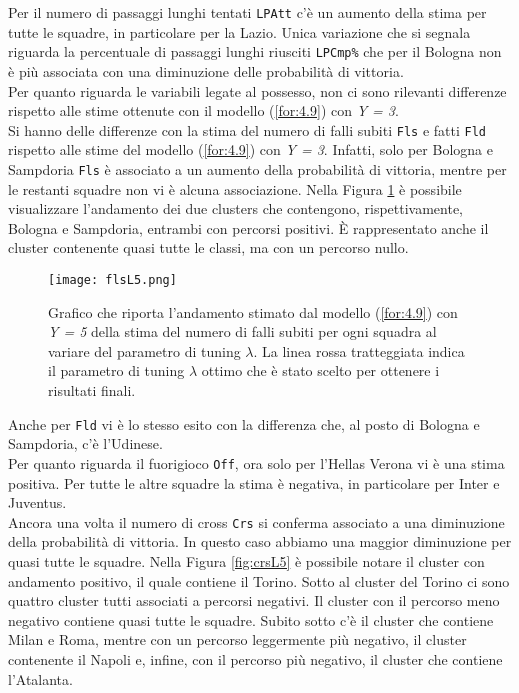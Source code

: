 Per il numero di passaggi lunghi tentati \texttt{LPAtt} c'è un aumento della stima per tutte le squadre, in particolare per la Lazio. Unica variazione che si segnala riguarda la percentuale di passaggi lunghi riusciti \texttt{LPCmp\%} che per il Bologna non è più associata con una diminuzione delle probabilità di vittoria.\\
Per quanto riguarda le variabili legate al possesso, non ci sono rilevanti differenze rispetto alle stime ottenute con il modello (\ref{for:4.9}) con \emph{Y = 3}.\\
Si hanno delle differenze con la stima del numero di falli subiti \texttt{Fls} e fatti \texttt{Fld} rispetto alle stime del modello (\ref{for:4.9}) con \emph{Y = 3}. Infatti, solo per Bologna e Sampdoria \texttt{Fls} è associato a un aumento della probabilità di vittoria, mentre per le restanti squadre non vi è alcuna associazione. Nella Figura \ref{fig:flsL5} è possibile visualizzare l'andamento dei due clusters che contengono, rispettivamente, Bologna e Sampdoria, entrambi con percorsi positivi. È rappresentato anche il cluster contenente quasi tutte le classi, ma con un percorso nullo.
\begin{figure}[htbp]
	\begin{center}
		\texttt{[image: flsL5.png]}
		\caption{Grafico che riporta l'andamento stimato dal modello (\ref{for:4.9}) con \emph{Y = 5} della stima del numero di falli subiti per ogni squadra al variare del parametro di tuning $\lambda$. La linea rossa tratteggiata indica il parametro di tuning $\lambda$ ottimo che è stato scelto per ottenere i risultati finali.} \label{fig:flsL5}
	\end{center}
\end{figure}
Anche per \texttt{Fld} vi è lo stesso esito con la differenza che, al posto di Bologna e Sampdoria, c'è l'Udinese.\\
Per quanto riguarda il fuorigioco \texttt{Off}, ora solo per l'Hellas Verona vi è una stima positiva. Per tutte le altre squadre la stima è negativa, in particolare per Inter e Juventus.\\
Ancora una volta il numero di cross \texttt{Crs} si conferma associato a una diminuzione della probabilità di vittoria. In questo caso abbiamo una maggior diminuzione per quasi tutte le squadre. Nella Figura \ref{fig:crsL5} è possibile notare il cluster con andamento positivo, il quale contiene il Torino. Sotto al cluster del Torino ci sono quattro cluster tutti associati a percorsi negativi. Il cluster con il percorso meno negativo contiene quasi tutte le squadre. Subito sotto c'è il cluster che contiene Milan e Roma, mentre con un percorso leggermente più negativo, il cluster contenente il Napoli e, infine, con il percorso più negativo, il cluster che contiene l'Atalanta.
